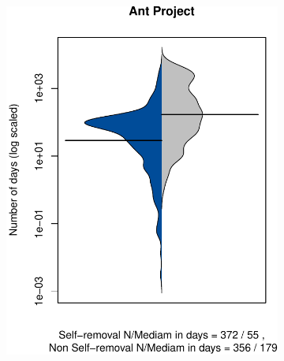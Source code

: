 \begin{figure}[t]
	\centering
	
	
	\begin{subfigure}[b]{0.24\textwidth}
		\includegraphics[width=\textwidth]{figures/test/Ant.pdf}
		\label{fig:removal_comparison_gerrit}
	\end{subfigure}
	\begin{subfigure}[b]{0.24\textwidth}

\end{subfigure}
\end{figure}
